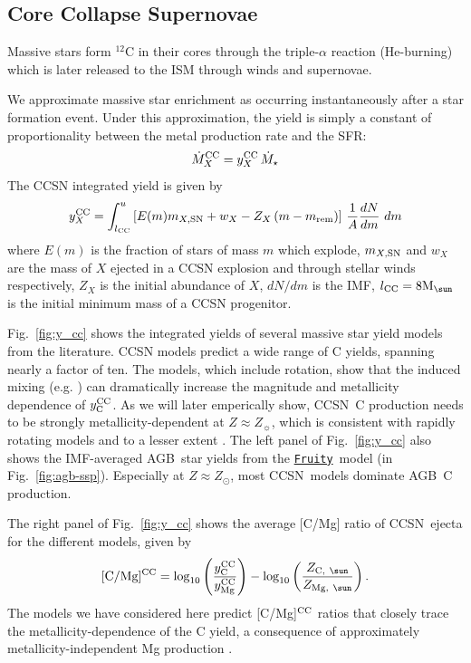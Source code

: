 \documentclass[fleqn,
usenatbib]{mnras}
\makeatletter
\newcommand{\VICE}{\textsc{vice}}
\newcommand{\fruity}{\texttt{\hyperlink{fruity}{Fruity}}}
\newcommand{\agb}{AGB}
\newcommand{\cc}{CCSN}
\newcommand{\Ycc}{{y_{\rm C}^{\rm CC}}}
\newcommand{\Yoc}{{y_{\rm Mg}^{\rm CC}}}
\newcommand{\Mo}{ {\rm M}_{\sun}}
\newcommand{\Zo}{ Z_{\sun}}
\DeclareRobustCommand\citepos
  {\begingroup
   \let\NAT@nmfmt\NAT@posfmt%
   \NAT@swafalse\let\NAT@ctype\z@\NAT@partrue
   \@ifstar{\NAT@fulltrue\NAT@citetp}{\NAT@fullfalse\NAT@citetp}}
\let\NAT@orig@nmfmt\NAT@nmfmt
\def\NAT@posfmt#1{\NAT@orig@nmfmt{#1's}}
\newcommand{\dbstrike}[1]{{\color{Thistle} \sout{#1} }}
\newcommand{\dbnote}[1]{ {\color{Thistle} \textit{\small (DB: #1)}} }
\makeatother
\begin{document}
\subsection{Core Collapse Supernovae}


Massive stars form $^{12}$C in their cores through the triple-$\alpha$ reaction (He-burning) which is later released to the ISM through winds and supernovae.

We approximate massive star enrichment as occurring instantaneously after a star formation event. Under this approximation, the yield is simply a constant  of proportionality between the metal production rate and the SFR:
\begin{equation}
    \dot{M}_X^{\rm CC} = y_{X}^{\rm CC}\, \dot{M}_\star
\end{equation}
The CCSN integrated yield is given by
\begin{equation}
y_{X}^{\rm CC} = \int_{l_{\rm CC}}^{u} \left[E(m) m_{X\rm, SN} + w_X - Z_X\,(m-m_{\rm rem})\right]\,\frac{1}{A} \frac{dN}{dm}\ dm
\end{equation}
where $E(m)$ is the fraction of stars of mass $m$ which explode, $m_{X,\rm SN}$ and $w_X$ are the mass of $X$ ejected in a CCSN explosion and through stellar winds respectively, $Z_X$ is the initial abundance of $X$, $dN/dm$ is the IMF, $l_{\rm CC}=8\Mo$ is the initial minimum mass of a CCSN progenitor. 

Fig.~\ref{fig:y_cc} shows the integrated yields of several massive star yield models from the literature. 
\cc{} models predict a wide range of C yields, spanning nearly a factor of ten. 
 The \cite{LC18} models, which include rotation, show that the induced mixing (e.g. \citealt{frischknecht+16}) can dramatically increase the magnitude and metallicity dependence of $\Ycc$. As we will later emperically show, \cc\ C production needs to be strongly metallicity-dependent at $Z \approx \Zo$, which is consistent with \citepos{LC18} rapidly rotating models and to a lesser extent \citet{NKT13}.
The left panel of Fig.~\ref{fig:y_cc} also shows the IMF-averaged \agb\ star yields from the \fruity\ model (in Fig.~\ref{fig:agb-ssp}). Especially at $Z\approx Z_\odot$, most \cc\ models dominate \agb\ C production. 


The right panel of Fig.~\ref{fig:y_cc} shows the average [C/Mg] ratio of \cc\ ejecta for the different models, given by
\begin{equation}\label{eq:c_mg_cc}
    {\rm [C/Mg]^{CC}} = \log_{10}\left( \frac{\Ycc}{\Yoc}\right) - \log_{10} \left( \frac{Z_{{\rm C},\ \sun }}{Z_{{\rm Mg},\ \sun }} \right).
\end{equation}
The models we have considered here predict [C/Mg]$^{\rm CC}$ ratios that closely trace the metallicity-dependence of the C yield, a consequence of approximately
metallicity-independent Mg production \citep[e.g][]{andrews+17}.
\end{document}
